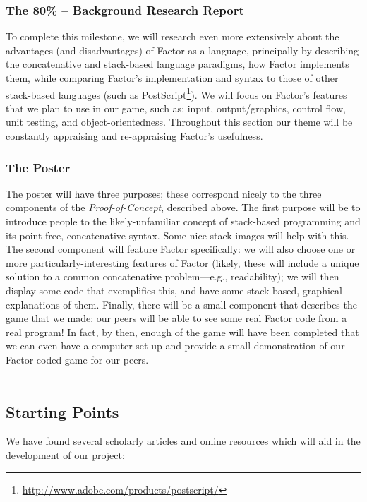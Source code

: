 \documentclass{sig-alternate}
\begin{document}
\subsubsection*{The 80\% -- Background Research Report}
To complete this milestone, we will research even more
extensively about the advantages (and disadvantages) of Factor as a
language, principally by describing the concatenative and stack-based language paradigms, how Factor implements them, while comparing Factor's implementation and syntax to those of other stack-based languages (such as PostScript\footnote{\url{http://www.adobe.com/products/postscript/}}). We will focus on Factor's features that we plan to use in our game, such as: input, output/graphics, control flow, unit testing, and object-orientedness. Throughout this section our theme will be constantly appraising and re-appraising Factor's usefulness.


\subsubsection*{The Poster}
The poster will have three purposes; these correspond nicely to the three components of the \textit{Proof-of-Concept}, described above. The first purpose will be to introduce people to the likely-unfamiliar concept of stack-based programming and its point-free, concatenative syntax. Some nice stack images will help with this. The second component will feature Factor specifically: we will also choose one or more particularly-interesting features of Factor (likely, these will include a unique solution to a common concatenative problem---e.g., readability); we will then display some code that exemplifies this, and have some stack-based, graphical explanations of them. Finally, there will be a small component that describes the game that we made: our peers will be able to see some real Factor code from a real program! In fact, by then, enough of the game will have been completed that we can even have a computer set up and provide a small demonstration of our Factor-coded game for our peers.
\\\\
\subsection{Starting Points}
We have found several scholarly articles and online resources
which will aid in the development of our project:
\end{document}
